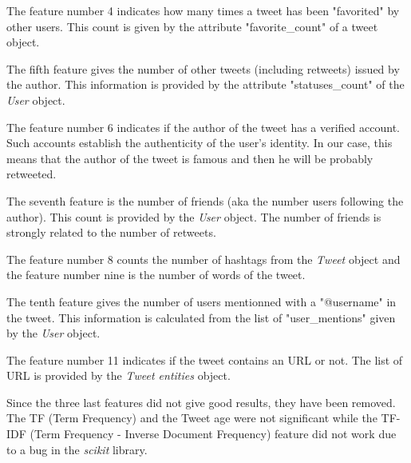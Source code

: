 The feature number 4 indicates how many times a tweet has been "favorited" by 
other users. This count is given by the attribute "favorite\_count"  of a tweet 
object.

The fifth feature gives the number of other tweets (including retweets) issued 
by the author. This information is provided by the attribute "statuses\_count" 
of the \emph{User} object.

The feature number 6 indicates if the author of the tweet has a verified 
account. Such accounts establish the authenticity of the user's identity. In 
our case, this means that the author of the tweet is famous and then he will be 
probably retweeted.

The seventh feature is the number of friends (aka the number users following 
the author). This count is provided by the \emph{User} object. The number of 
friends is strongly related to the number of retweets.

The feature number 8 counts the number of hashtags from the \emph{Tweet} 
object and the feature number nine is the number of words of the tweet.

The tenth feature gives the number of users mentionned with a "@username" in 
the tweet. This information is calculated from the list of "user\_mentions" 
given by the \emph{User} object.

The feature number 11 indicates if the tweet contains an URL or not. The 
list of URL is provided by the \emph{Tweet entities} object.

Since the three last features did not give good results, they have been 
removed. The TF (Term Frequency) and the Tweet age were not significant while 
the TF-IDF (Term Frequency - Inverse Document Frequency) feature did not work 
due to a bug in the \emph{scikit} library.